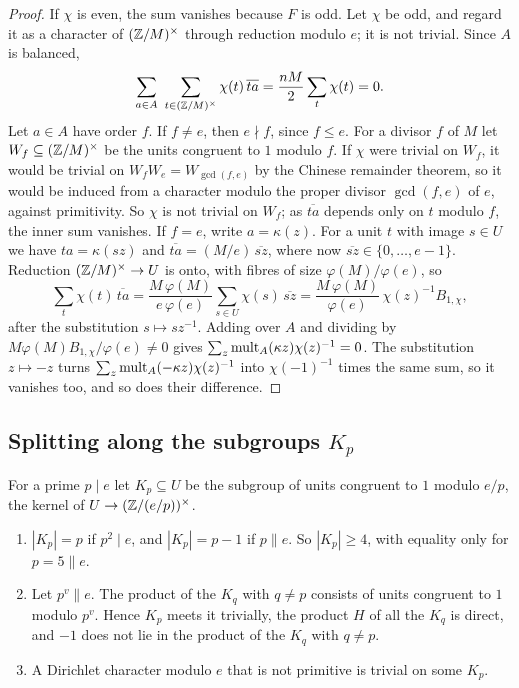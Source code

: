 \begin{proof}
If $\chi$ is even, the sum vanishes because $F$ is odd. Let $\chi$ be odd,
and regard it as a character of $(\mathbb{Z}/M)^{\times}$ through reduction modulo
$e$; it is not trivial. Since $A$ is balanced,
\[
  \sum_{a\in A}\ \sum_{t\in(\ZZ/M)^{\times}}\chi(t)\,\overline{ta}
  =\frac{nM}{2}\sum_{t}\chi(t)=0.
\]
Let $a\in A$ have order $f$. If $f\ne e$, then $e\nmid f$, since $f\le e$.
For a divisor $f$ of $M$ let $W_{f}\subseteq(\mathbb{Z}/M)^{\times}$ be the units
congruent to $1$ modulo $f$. If $\chi$ were trivial on $W_{f}$, it would be
trivial on $W_{f}W_{e}=W_{\gcd(f,e)}$ by the Chinese remainder theorem, so it
would be induced from a character modulo the proper divisor $\gcd(f,e)$ of
$e$, against primitivity. So $\chi$ is not trivial on $W_{f}$; as
$\overline{ta}$ depends only on $t$ modulo $f$, the inner sum vanishes. If
$f=e$, write $a=\kappa(z)$. For a unit $t$ with image $s\in U$ we have
$ta=\kappa(sz)$ and $\overline{ta}=(M/e)\,\overline{sz}$, where now
$\overline{sz}\in\{0,\dots,e-1\}$. Reduction $(\mathbb{Z}/M)^{\times}\to U$ is onto,
with fibres of size $\varphi(M)/\varphi(e)$, so
\[
  \sum_{t}\chi(t)\,\overline{ta}=\frac{M\,\varphi(M)}{e\,\varphi(e)}
  \sum_{s\in U}\chi(s)\,\overline{sz}=\frac{M\,\varphi(M)}{\varphi(e)}\,
  \chi(z)^{-1}B_{1,\chi},
\]
after the substitution $s\mapsto sz^{-1}$. Adding over $A$ and dividing by
$M\varphi(M)B_{1,\chi}/\varphi(e)\ne0$ gives $\sum_{z}\operatorname{mult}_{A}(\kappa z)
\chi(z)^{-1}=0$. The substitution $z\mapsto-z$ turns
$\sum_{z}\operatorname{mult}_{A}(-\kappa z)\chi(z)^{-1}$ into $\chi(-1)^{-1}$ times the
same sum, so it vanishes too, and so does their difference.
\end{proof}

\subsection{Splitting along the subgroups \texorpdfstring{$K_{p}$}{K\_p}}
For a prime $p\mid e$ let $K_{p}\subseteq U$ be the subgroup of units
congruent to $1$ modulo $e/p$, the kernel of $U\to(\mathbb{Z}/(e/p))^{\times}$.

\begin{lemma}\label{lem:Kp}
\begin{enumerate}[label=\textup{(\alph*)}]
\item $|K_{p}|=p$ if $p^{2}\mid e$, and $|K_{p}|=p-1$ if $p\parallel e$. So
$|K_{p}|\ge4$, with equality only for $p=5\parallel e$.
\item Let $p^{v}\parallel e$. The product of the $K_{q}$ with $q\ne p$
consists of units congruent to $1$ modulo $p^{v}$. Hence $K_{p}$ meets it
trivially, the product $H$ of all the $K_{q}$ is direct, and $-1$ does not
lie in the product of the $K_{q}$ with $q\ne p$.
\item A Dirichlet character modulo $e$ that is not primitive is trivial on
some $K_{p}$.
\end{enumerate}
\end{lemma}

